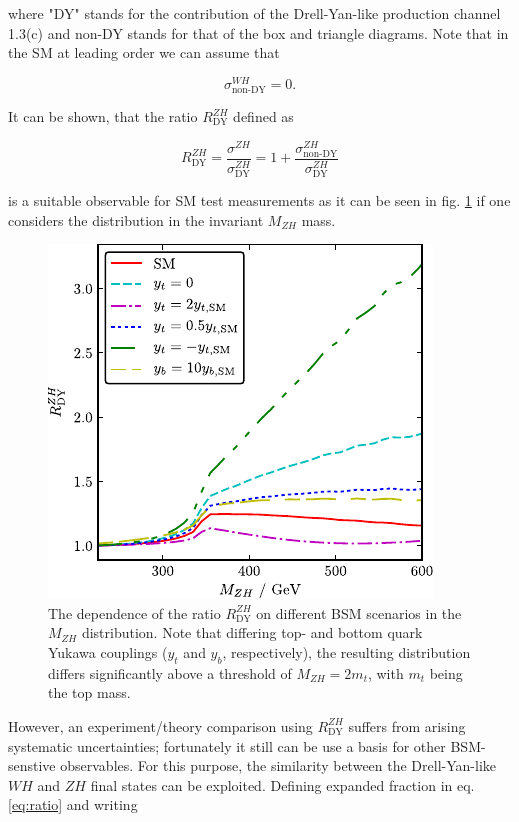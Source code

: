 where "DY" stands for the contribution of the Drell-Yan-like production channel 1.3(c) and non-DY stands for that of the box and triangle diagrams. Note that in the SM at leading order we can assume that

\begin{equation*}
	\sigma^{WH}_\text{non-DY} = 0.
\end{equation*}

It can be shown, that the ratio $R^{ZH}_\text{DY}$ defined as

\begin{equation}
	R^{ZH}_\text{DY} = \frac{\sigma^{ZH}}{\sigma^{ZH}_\text{DY}} = 1 + \frac{\sigma^{ZH}_\text{non-DY}}{\sigma^{ZH}_\text{DY}}
	\label{eq:ratio}
\end{equation}

is a suitable observable for SM test measurements as it can be seen in fig. \ref{fig:RZH} if one considers the distribution in the invariant $M_{ZH}$ mass.

\begin{figure}[h!]
	\centering
	\includegraphics[width=0.6\linewidth]{figures/theory/RZH.pdf}
	\caption{The dependence of the ratio $R^{ZH}_\text{DY}$ on different BSM scenarios in the $M_{ZH}$ distribution. Note that differing top- and bottom quark Yukawa couplings ($y_t$ and $y_b$, respectively), the resulting distribution differs significantly above a threshold of $M_{ZH}=2m_t$, with $m_t$ being the top mass.}
	\label{fig:RZH}
\end{figure}

However, an experiment/theory comparison using $R^{ZH}_\text{DY}$ suffers from arising systematic uncertainties; fortunately it still can be use a basis for other BSM-senstive observables. For this purpose, the similarity between the Drell-Yan-like $WH$ and $ZH$ final states can be exploited. Defining expanded fraction in eq. \ref{eq:ratio} and writing

